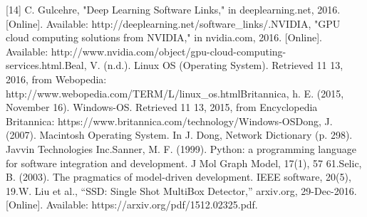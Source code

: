\documentclass{scrreprt}
\begin{document}
[14] C. Gulcehre, "Deep Learning Software Links," in deeplearning.net, 2016. [Online]. Available: http://deeplearning.net/software_links/.\newline
[15] NVIDIA, "GPU cloud computing solutions from NVIDIA," in nvidia.com, 2016. [Online]. Available: http://www.nvidia.com/object/gpu-cloud-computing-services.html.\newline
[16] Beal, V. (n.d.). Linux OS (Operating System). Retrieved 11 13, 2016, from Webopedia: http://www.webopedia.com/TERM/L/linux_os.html\newline
[17] Britannica, h. E. (2015, November 16). Windows-OS. Retrieved 11 13, 2015, from Encyclopedia Britannica: https://www.britannica.com/technology/Windows-OS\newline
[18] Dong, J. (2007). Macintosh Operating System. In J. Dong, Network Dictionary (p. 298). Javvin Technologies Inc.\newline
[19] Sanner, M. F. (1999). Python: a programming language for software integration and	development. J Mol Graph Model, 17(1), 57 61.\newline
[20] Selic, B. (2003). The pragmatics of model-driven development. IEEE software, 20(5), 19.\newline
[21] W. Liu et al., “SSD: Single Shot MultiBox Detector,” arxiv.org, 29-Dec-2016. [Online]. Available: https://arxiv.org/pdf/1512.02325.pdf.
\end{document}
